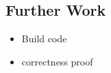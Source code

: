 \documentclass{article}
\begin{document}
\subsection{Further Work}

\begin{itemize}
  \item Build code
  \item correctness proof 
\end{itemize}

 

%











     
\end{document}
